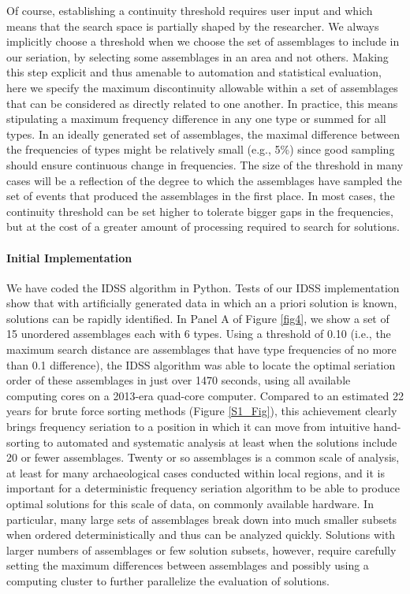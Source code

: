 \documentclass[10pt,letterpaper]{article}
\begin{document}
Of course, establishing a continuity threshold requires user input and which means that the search space is partially shaped by the researcher.  We always implicitly choose a threshold when we choose the set of assemblages to include in our seriation, by selecting some assemblages in an area and not others. Making this step explicit and thus amenable to automation and statistical evaluation, here we specify the maximum discontinuity allowable within a set of assemblages that can be considered as directly related to one another. In practice, this means stipulating a maximum frequency difference in any one type or summed for all types. In an ideally generated set of assemblages, the maximal difference between the frequencies of types might be relatively small (e.g., 5\%) since good sampling should ensure continuous change in frequencies. The size of the threshold in many cases will be a reflection of the degree to which the assemblages have sampled the set of events that produced the assemblages in the first place. In most cases, the continuity threshold can be set higher to tolerate bigger gaps in the frequencies, but at the cost of a greater amount of processing required to search for solutions. 

\paragraph{Initial Implementation}

We have coded the IDSS algorithm in Python. Tests of our IDSS implementation show that with artificially generated data in which an a priori solution is known, solutions can be rapidly identified. In Panel A of Figure \ref{fig4}, we show a set of 15 unordered assemblages each with 6 types. Using a threshold of 0.10 (i.e., the maximum search distance are assemblages that have type frequencies of no more than 0.1 difference), the IDSS algorithm was able to locate the optimal seriation order of these assemblages in just over 1470 seconds, using all available computing cores on a 2013-era quad-core computer. Compared to an estimated 22 years for brute force sorting methods (Figure \ref{S1_Fig}), this achievement clearly brings frequency seriation to a position in which it can move from intuitive hand-sorting to automated and systematic analysis at least when the solutions include 20 or fewer assemblages. Twenty or so assemblages is a common scale of analysis, at least for many archaeological cases conducted within local regions, and it is important for a deterministic frequency seriation algorithm to be able to produce optimal solutions for this scale of data, on commonly available hardware. In particular, many large sets of assemblages break down into much smaller subsets when ordered deterministically and thus can be analyzed quickly. Solutions with larger numbers of assemblages or few solution subsets, however, require carefully setting the maximum differences between assemblages and possibly using a computing cluster to further parallelize the evaluation of solutions. 
\end{document}
